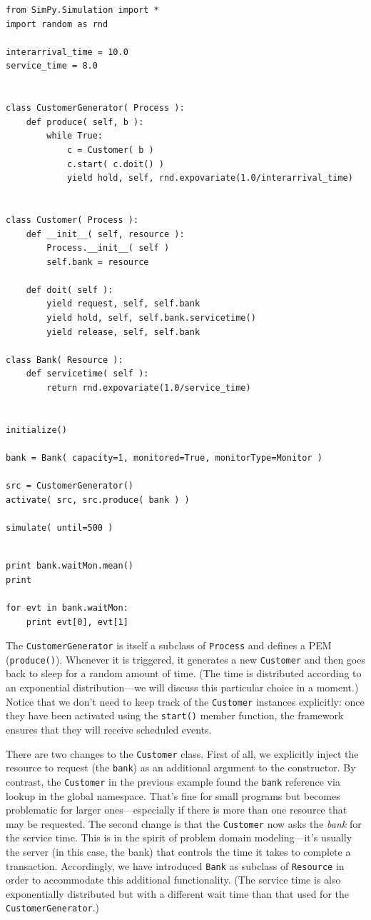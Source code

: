 \begin{verbatim}
from SimPy.Simulation import *
import random as rnd

interarrival_time = 10.0
service_time = 8.0


class CustomerGenerator( Process ):
    def produce( self, b ):
        while True:
            c = Customer( b )
            c.start( c.doit() )
            yield hold, self, rnd.expovariate(1.0/interarrival_time)


class Customer( Process ):
    def __init__( self, resource ):
        Process.__init__( self )
        self.bank = resource
    
    def doit( self ):
        yield request, self, self.bank
        yield hold, self, self.bank.servicetime()
        yield release, self, self.bank

class Bank( Resource ):
    def servicetime( self ):
        return rnd.expovariate(1.0/service_time)


initialize()

bank = Bank( capacity=1, monitored=True, monitorType=Monitor )

src = CustomerGenerator()
activate( src, src.produce( bank ) )

simulate( until=500 )
\end{verbatim}
\begin{verbatim}

print bank.waitMon.mean()
print

for evt in bank.waitMon:
    print evt[0], evt[1]
\end{verbatim}\vspace*{-4pt}

The \texttt{CustomerGenerator} is itself a subclass of
\texttt{Process} and defines a PEM (\texttt{produce()}). Whenever it
is triggered, it generates a new \texttt{Customer} and then goes back
to sleep for a random amount of time. (The time is distributed
according to an exponential distribution---we will discuss this
particular choice in a moment.) Notice that we don't need to keep
track of the \texttt{Customer} instances explicitly: once they have
been activated using the \texttt{start()} member function, the
framework ensures that they will receive scheduled events.

There are two changes to the \texttt{Customer} class. First of all, we
explicitly inject the resource to request (the \texttt{bank}) as an
additional argument to the constructor. By contrast, the
\texttt{Customer} in the previous example found the \texttt{bank}
reference via lookup in the global namespace. That's fine for small
programs but becomes problematic for larger ones---especially if
there is more than one resource that may be requested. The second
change is that the \texttt{Customer} now asks the \emph{bank} for the
service time. This is in the spirit of problem domain modeling---it's
usually the server (in this case, the bank) that controls the time it
takes to complete a transaction.  Accordingly, we have introduced
\texttt{Bank} as subclass of \texttt{Resource} in order to accommodate
this additional functionality. (The service time is also exponentially
distributed but with a different wait time than that used for the
\texttt{CustomerGenerator}.)

